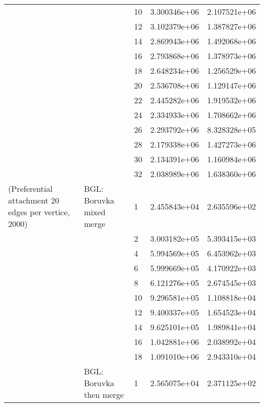 \begin{tabular}{lllrr}
                      &            & 10 &  3.300346e+06 &  2.107521e+06 \\
                      &            & 12 &  3.102379e+06 &  1.387827e+06 \\
                      &            & 14 &  2.869943e+06 &  1.492068e+06 \\
                      &            & 16 &  2.793868e+06 &  1.378973e+06 \\
                      &            & 18 &  2.648234e+06 &  1.256529e+06 \\
                      &            & 20 &  2.536708e+06 &  1.129147e+06 \\
                      &            & 22 &  2.445282e+06 &  1.919532e+06 \\
                      &            & 24 &  2.334933e+06 &  1.708662e+06 \\
                      &            & 26 &  2.293792e+06 &  8.328328e+05 \\
                      &            & 28 &  2.179338e+06 &  1.427273e+06 \\
                      &            & 30 &  2.134391e+06 &  1.160984e+06 \\
                      &            & 32 &  2.038989e+06 &  1.638360e+06 \\
(Preferential attachment 20 edges per vertice, 2000) & BGL: Boruvka mixed merge & 1  &  2.455843e+04 &  2.635596e+02 \\
                      &            & 2  &  3.003182e+05 &  5.393415e+03 \\
                      &            & 4  &  5.994569e+05 &  6.453962e+03 \\
                      &            & 6  &  5.999669e+05 &  4.170922e+03 \\
                      &            & 8  &  6.121276e+05 &  2.674545e+03 \\
                      &            & 10 &  9.296581e+05 &  1.108818e+04 \\
                      &            & 12 &  9.400337e+05 &  1.654523e+04 \\
                      &            & 14 &  9.625101e+05 &  1.989841e+04 \\
                      &            & 16 &  1.042881e+06 &  2.038992e+04 \\
                      &            & 18 &  1.091010e+06 &  2.943310e+04 \\
                      & BGL: Boruvka then merge & 1  &  2.565075e+04 &  2.371125e+02 \\

\end{tabular}
